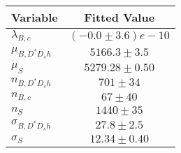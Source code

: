 \begin{tabular}[t]{lc}
\hline
Variable &Fitted Value\\
\hline\hline
$\lambda_{B,c}$&$(-0.0\pm3.6)e-10$\\
\hline
$\mu_{B, D^* D_s h}$&$5166.3\pm3.5$\\
\hline
$\mu_S$&$5279.28\pm0.50$\\
\hline
$n_{B, D^* D_s h}$&$701\pm34$\\
\hline
$n_{B,c}$&$67\pm40$\\
\hline
$n_S$&$1440\pm35$\\
\hline
$\sigma_{B, D^* D_s h}$&$27.8\pm2.5$\\
\hline
$\sigma_S$&$12.34\pm0.40$\\
\hline
\end{tabular}
